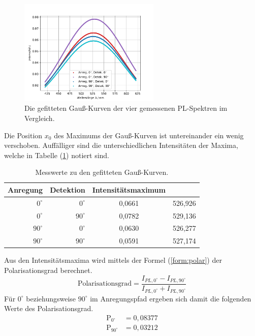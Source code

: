 \begin{figure}[hbtp]
\centering
	\includegraphics[width=0.6\textwidth]{Plots/aufgabe3_korrek.pdf}
	\caption{Die gefitteten Gau{\ss}-Kurven der vier gemessenen PL-Spektren im Vergleich.}
	\label{abb:auf3_vergleich}
\end{figure}
Die Position $x_0$ des Maximums der Gau{\ss}-Kurven ist untereinander ein wenig verschoben.
Auff\"{a}lliger sind die unterschiedlichen Intensit\"{a}ten der Maxima, welche in Tabelle (\ref{tab:auf3_vergleich}) notiert sind.
\begin{table}
\centering
\caption{Messwerte zu den gefitteten Gau{\ss}-Kurven.}
	\begin{tabular}{|rrcc|}
	\hline
	{Anregung} & {Detektion} & {Intensit\"{a}tsmaximum} &  \\
	\hline
	$0^{\circ}$ & $0^{\circ}$ & 0,0661 & 526,926\\
	$0^{\circ}$ & $90^{\circ}$ & 0,0782 & 529,136\\
	$90^{\circ}$ & $0^{\circ}$ & 0,0630 & 526,277\\
	$90^{\circ}$ & $90^{\circ}$ & 0,0591 & 527,174\\
	\hline
\end{tabular}
\label{tab:auf3_vergleich}
\end{table}
Aus den Intensit\"{a}tsmaxima wird mittels der Formel (\ref{form:polar}) der Polarisationsgrad berechnet.
\begin{equation}
	\text{Polarisationsgrad} = \frac{I_{PL,0^{\circ}} - I_{PL,90^{\circ}}}{I_{PL,0^{\circ}} + I_{PL,90^{\circ}}}
	\label{form:polar}
\end{equation}
F\"{u}r $0^{\circ}$ beziehungsweise $90^{\circ}$ im Anregungspfad ergeben sich damit die folgenden Werte des Polarisationsgrad.
\begin{align*}
	\text{P}_{0^{\circ}} &= 0,08377 \\
	\text{P}_{90^{\circ}} &= 0,03212 \\	
\end{align*}
